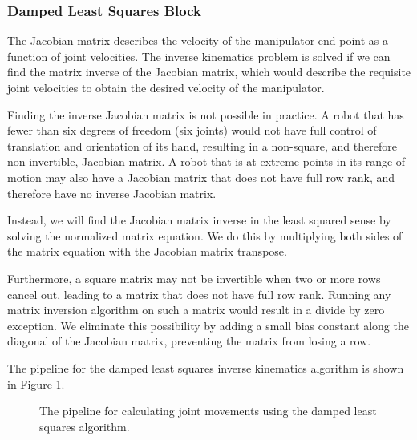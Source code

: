 \subsubsection{Damped Least Squares Block}

The Jacobian matrix describes the velocity of the manipulator end point as a function of joint velocities. The inverse kinematics problem is solved if we can find the matrix inverse of the Jacobian matrix, which would describe the requisite joint velocities to obtain the desired velocity of the manipulator.

Finding the inverse Jacobian matrix is not possible in practice. A robot that has fewer than six degrees of freedom (six joints) would not have full control of translation and orientation of its hand, resulting in a non-square, and therefore non-invertible, Jacobian matrix. A robot that is at extreme points in its range of motion may also have a Jacobian matrix that does not have full row rank, and therefore have no inverse Jacobian matrix.

Instead, we will find the Jacobian matrix inverse in the least squared sense by solving the normalized matrix equation. We do this by multiplying both sides of the matrix equation with the Jacobian matrix transpose.

Furthermore, a square matrix may not be invertible when two or more rows cancel out, leading to a matrix that does not have full row rank. Running any matrix inversion algorithm on such a matrix would result in a divide by zero exception. We eliminate this possibility by adding a small bias constant along the diagonal of the Jacobian matrix, preventing the matrix from losing a row.

The pipeline for the damped least squares inverse kinematics algorithm is shown in Figure \ref{fig:damped_least_squares}.

\begin{figure}[ht]
\center
{}
\caption{The pipeline for calculating joint movements using the damped least squares algorithm.}
\label{fig:damped_least_squares}
\end{figure}